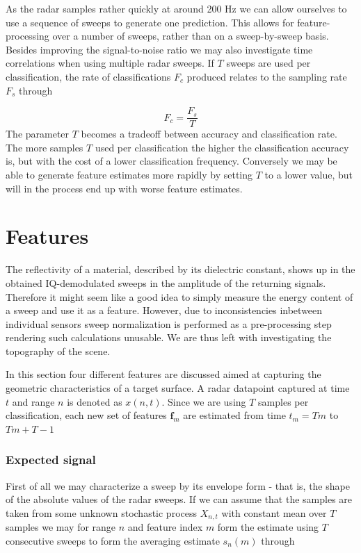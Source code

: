 As the radar samples rather quickly at around 200 Hz we can allow ourselves to use a sequence of sweeps to generate one prediction. This allows for feature-processing over a number of sweeps, rather than on a sweep-by-sweep basis. Besides improving the signal-to-noise ratio \citep{w_doerry_2016} we may also investigate time correlations when using multiple radar sweeps. If $T$ sweeps are used per classification, the rate of classifications $F_c$ produced relates to the sampling rate $F_s$ through

\begin{equation}
	\label{eq:classification_rate}
	F_c = \frac{F_s}{T}
\end{equation} 
The parameter $T$ becomes a tradeoff between accuracy and classification rate. The more samples $T$ used per classification the higher the classification accuracy is, but with the cost of a lower classification frequency. Conversely we may be able to generate feature estimates more rapidly by setting $T$ to a lower value, but will in the process end up with worse feature estimates. 

\section{Features}

The reflectivity of a material, described by its dielectric constant, shows up in the obtained IQ-demodulated sweeps in the amplitude of the returning signals. Therefore it might seem like a good idea to simply measure the energy content of a sweep and use it as a feature. However, due to inconsistencies inbetween individual sensors sweep normalization is performed as a pre-processing step rendering such calculations unusable. We are thus left with investigating the topography of the scene. 

In this section four different features are discussed aimed at capturing the geometric characteristics of a target surface. A radar datapoint captured at time $t$ and range $n$ is denoted as $x(n,t)$. Since we are using $T$ samples per classification, each new set of features $\mathbf{f}_m$ are estimated from time $t_m=Tm$ to $Tm+T-1$ 

\subsubsection{Expected signal}

First of all we may characterize a sweep by its envelope form - that is, the shape of the absolute values of the radar sweeps. If we can assume that the samples are taken from some unknown stochastic process $X_{n,t}$ with constant mean over $T$ samples we may for range $n$ and feature index $m$ form the estimate using $T$ consecutive sweeps to form the averaging estimate $s_n(m)$ through


